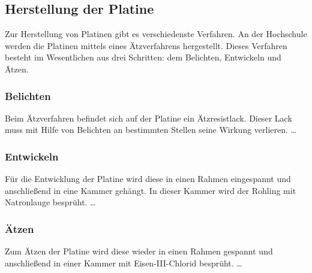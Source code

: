 \subsection{Herstellung der Platine}
Zur Herstellung von Platinen gibt es verschiedenste Verfahren. An der Hochschule werden die Platinen mittels eines Ätzverfahrens hergestellt. Dieses Verfahren besteht im Wesentlichen aus drei Schritten: dem Belichten, Entwickeln und Ätzen.

\subsubsection{Belichten}
Beim Ätzverfahren befindet sich auf der Platine ein Ätzresistlack. Dieser Lack muss mit Hilfe von Belichten an bestimmten Stellen seine Wirkung verlieren. \ldots

\subsubsection{Entwickeln}
Für die Entwicklung der Platine wird diese in einen Rahmen eingespannt und anschließend in eine Kammer gehängt. In dieser Kammer wird der Rohling mit Natronlauge besprüht. \ldots

\subsubsection{Ätzen}
Zum Ätzen der Platine wird diese wieder in einen Rahmen gespannt und anschließend in einer Kammer mit Eisen-III-Chlorid besprüht. \ldots
